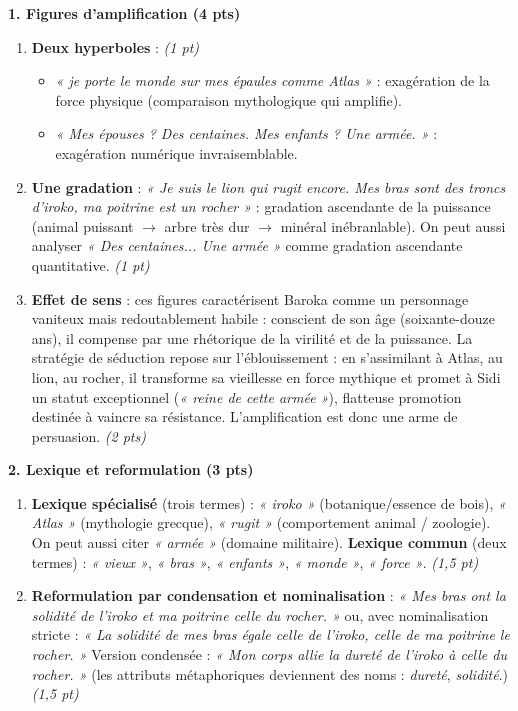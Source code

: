 \documentclass[11pt]{article}
\begin{document}
\begin{corrige}
\textbf{1. Figures d'amplification (4 pts)}
\begin{enumerate}
    \item \textbf{Deux hyperboles} : \textit{(1 pt)}
    \begin{itemize}
        \item \emph{« je porte le monde sur mes épaules comme Atlas »} : exagération de la force physique (comparaison mythologique qui amplifie).
        \item \emph{« Mes épouses ? Des centaines. Mes enfants ? Une armée. »} : exagération numérique invraisemblable.
    \end{itemize}
    \item \textbf{Une gradation} : \emph{« Je suis le lion qui rugit encore. Mes bras sont des troncs d'iroko, ma poitrine est un rocher »} : gradation ascendante de la puissance (animal puissant $\rightarrow$ arbre très dur $\rightarrow$ minéral inébranlable). On peut aussi analyser \emph{« Des centaines... Une armée »} comme gradation ascendante quantitative. \textit{(1 pt)}
    \item \textbf{Effet de sens} : ces figures caractérisent Baroka comme un personnage vaniteux mais redoutablement habile : conscient de son âge (soixante-douze ans), il compense par une rhétorique de la virilité et de la puissance. La stratégie de séduction repose sur l'éblouissement : en s'assimilant à Atlas, au lion, au rocher, il transforme sa vieillesse en force mythique et promet à Sidi un statut exceptionnel (\emph{« reine de cette armée »}), flatteuse promotion destinée à vaincre sa résistance. L'amplification est donc une arme de persuasion. \textit{(2 pts)}
\end{enumerate}

\textbf{2. Lexique et reformulation (3 pts)}
\begin{enumerate}
    \item \textbf{Lexique spécialisé} (trois termes) : \emph{« iroko »} (botanique/essence de bois), \emph{« Atlas »} (mythologie grecque), \emph{« rugit »} (comportement animal / zoologie). On peut aussi citer \emph{« armée »} (domaine militaire). \textbf{Lexique commun} (deux termes) : \emph{« vieux »}, \emph{« bras »}, \emph{« enfants »}, \emph{« monde »}, \emph{« force »}. \textit{(1,5 pt)}
    \item \textbf{Reformulation par condensation et nominalisation} : \emph{« Mes bras ont la solidité de l'iroko et ma poitrine celle du rocher. »} ou, avec nominalisation stricte : \emph{« La solidité de mes bras égale celle de l'iroko, celle de ma poitrine le rocher. »} Version condensée : \emph{« Mon corps allie la dureté de l'iroko à celle du rocher. »} (les attributs métaphoriques deviennent des noms : \emph{dureté}, \emph{solidité}.) \textit{(1,5 pt)}
\end{enumerate}


\end{corrige}
\end{document}
